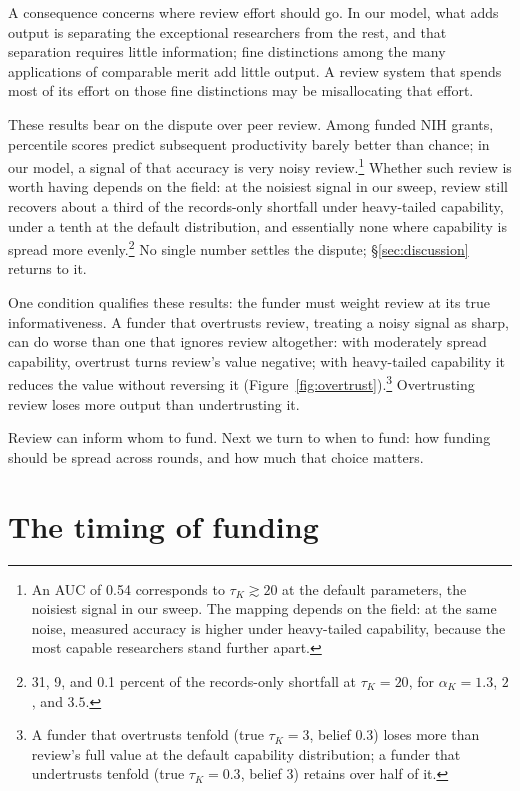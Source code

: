 \documentclass[article, 11pt, reqno]{amsart}
\theoremstyle{named}
\begin{document}


A consequence concerns where review effort should go. In our model, what adds output is separating the exceptional researchers from the rest, and that separation requires little information; fine distinctions among the many applications of comparable merit add little output. A review system that spends most of its effort on those fine distinctions may be misallocating that effort.

These results bear on the dispute over peer review. Among funded NIH grants, percentile scores predict subsequent productivity barely better than chance; in our model, a signal of that accuracy is very noisy review.\footnote{An AUC of 0.54 \citep{Fang2016} corresponds to $\tau_K \gtrsim 20$ at the default parameters, the noisiest signal in our sweep. The mapping depends on the field: at the same noise, measured accuracy is higher under heavy-tailed capability, because the most capable researchers stand further apart.} Whether such review is worth having depends on the field: at the noisiest signal in our sweep, review still recovers about a third of the records-only shortfall under heavy-tailed capability, under a tenth at the default distribution, and essentially none where capability is spread more evenly.\footnote{31, 9, and 0.1 percent of the records-only shortfall at $\tau_K = 20$, for $\alpha_K = 1.3$, $2$, and $3.5$.} No single number settles the dispute; \S\ref{sec:discussion} returns to it.

One condition qualifies these results: the funder must weight review at its true informativeness. A funder that overtrusts review, treating a noisy signal as sharp, can do worse than one that ignores review altogether: with moderately spread capability, overtrust turns review's value negative; with heavy-tailed capability it reduces the value without reversing it (Figure~\ref{fig:overtrust}).\footnote{A funder that overtrusts tenfold (true $\tau_K = 3$, belief $0.3$) loses more than review's full value at the default capability distribution; a funder that undertrusts tenfold (true $\tau_K = 0.3$, belief $3$) retains over half of it.} Overtrusting review loses more output than undertrusting it.



Review can inform whom to fund. Next we turn to when to fund: how funding should be spread across rounds, and how much that choice matters.

\section{The timing of funding}\label{sec:timing}
\end{document}
